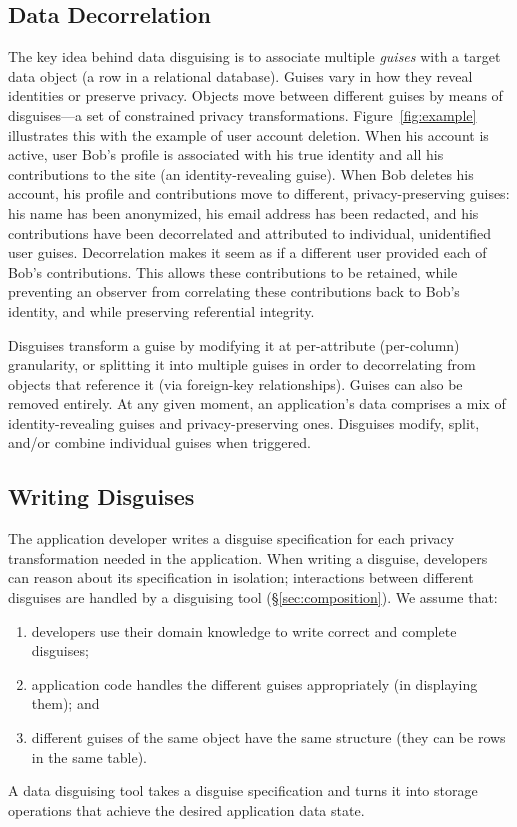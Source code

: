 \subsection{Data Decorrelation}
%
The key idea behind data disguising is to associate multiple \emph{guises} with a target data
object (\ie a row in a relational database).
%
Guises vary in how they reveal identities or preserve privacy.
%
Objects move between different guises by means of disguises---a set of constrained privacy
transformations.
%
Figure~\ref{fig:example} illustrates this with the example of user account deletion.
%
When his account is active, user Bob's profile is associated with his true identity and all his
contributions to the site (an identity-revealing guise).
%
When Bob deletes his account, his profile and contributions move to different, privacy-preserving
guises: his name has been anonymized, his email address has been redacted, and his contributions
have been decorrelated and attributed to individual, unidentified user guises.
%
Decorrelation makes it seem as if a different user provided each of Bob's contributions. This allows
these contributions to be retained, while preventing an observer from correlating these
contributions back to Bob's identity, and while preserving referential integrity.

Disguises transform a guise by modifying it at per-attribute (\ie per-column) granularity, or
splitting it into multiple guises in order to decorrelating from objects that reference it (via \eg foreign-key relationships).
Guises can also be removed entirely.
At any given moment, an application's data comprises a mix of identity-revealing guises
and privacy-preserving ones. Disguises modify, split, and/or combine individual guises when triggered.

\subsection{Writing Disguises}
\label{sec:disguises}
The application developer writes a disguise specification for each privacy transformation needed
in the application.
%
When writing a disguise, developers can reason about its
specification in isolation; interactions between different disguises are handled by a disguising
tool (\S\ref{sec:composition}).
%
We assume that:
\begin{enumerate}[nosep]
  \item developers use their domain knowledge to write correct and complete disguises;
  \item application code handles the different guises appropriately (\eg in
    displaying them); and
  \item different guises of the same object have the same structure (\eg they can be
    rows in the same table).
\end{enumerate}
%
A data disguising tool takes a disguise specification and turns it into storage operations that
achieve the desired application data state.

